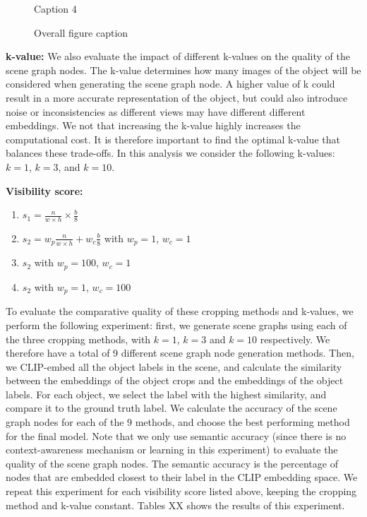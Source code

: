 \begin{figure}[h!]
\begin{minipage}[b]{0.1\textwidth}
        \caption{Caption 4}
    \end{minipage}
    \caption{Overall figure caption}
\end{figure}

\bigskip \noindent
\textbf{k-value:}
We also evaluate the impact of different k-values on the quality of the scene graph nodes. The k-value determines how many images of the object will be considered when generating the scene graph node. A higher value of k could result in a more accurate representation of the object, but could also introduce noise or inconsistencies as different views may have different different embeddings. We not that increasing the k-value highly increases the computational cost. It is therefore important to find the optimal k-value that balances these trade-offs. In this analysis we consider the following k-values: $k=1$, $k=3$, and $k=10$.

\bigskip \noindent
\textbf{Visibility score:}
\begin{enumerate}
    \item $s_1 = \frac{n}{w \times h} \times \frac{b}{8}$
    \item $s_2 = w_p \frac{n}{w \times h} + w_c \frac{b}{8}$ with $w_p = 1$, $w_c = 1$
    \item $s_2$ with $w_p = 100$, $w_c = 1$
    \item $s_2$ with $w_p = 1$, $w_c = 100$
\end{enumerate}

To evaluate the comparative quality of these cropping methods and k-values, we perform the following experiment: first, we generate scene graphs using each of the three cropping methods, with $k=1$, $k=3$ and $k=10$ respectively. We therefore have a total of 9 different scene graph node generation methods. Then, we CLIP-embed all the object labels in the scene, and calculate the similarity between the embeddings of the object crops and the embeddings of the object labels. For each object, we select the label with the highest similarity, and compare it to the ground truth label. We calculate the accuracy of the scene graph nodes for each of the 9 methods, and choose the best performing method for the final model.  Note that we only use semantic accuracy (since there is no context-awareness mechanism or learning in this experiment) to evaluate the quality of the scene graph nodes. The semantic accuracy is the percentage of nodes that are embedded closest to their label in the CLIP embedding space. We repeat this experiment for each visibility score listed above, keeping the cropping method and k-value constant. Tables XX shows the results of this experiment.

